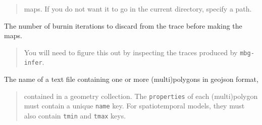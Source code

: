 %
\begin{quote}

maps. If you do not want it to go in the current directory, specify a path.

\end{quote}
\setcounter{listcnt0}{0}
\begin{list}{.}
{
\addtocounter{listcnt0}{2}
\setlength{\rightmargin}{\leftmargin}
}

\item The number of burnin iterations to discard from the trace before making the maps.
\end{list}

%
\begin{quote}

You will need to figure this out by inspecting the traces produced by \texttt{mbg-infer}.

\end{quote}
\setcounter{listcnt0}{0}
\begin{list}{.}
{
\addtocounter{listcnt0}{3}
\setlength{\rightmargin}{\leftmargin}
}

\item The name of a text file containing one or more (multi)polygons in geojson format,
\end{list}

%
\begin{quote}

contained in a geometry collection. The \texttt{properties} of each (multi)polygon must
contain a unique \texttt{name} key. For spatiotemporal models, they must also contain
\texttt{tmin} and \texttt{tmax} keys.

\end{quote}




